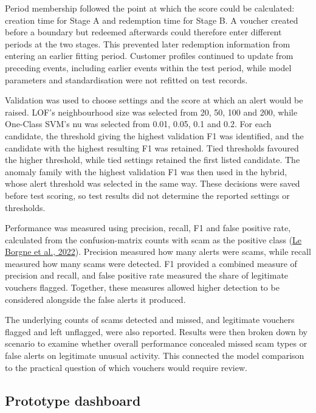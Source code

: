 \documentclass[11pt,a4paper]{article}
\begin{document}
Period membership followed the point at which the score could be calculated: creation time for Stage A and redemption time for Stage B. A voucher created before a boundary but redeemed afterwards could therefore enter different periods at the two stages. This prevented later redemption information from entering an earlier fitting period. Customer profiles continued to update from preceding events, including earlier events within the test period, while model parameters and standardisation were not refitted on test records.

Validation was used to choose settings and the score at which an alert would be raised. LOF's neighbourhood size was selected from 20, 50, 100 and 200, while One-Class SVM's nu was selected from 0.01, 0.05, 0.1 and 0.2. For each candidate, the threshold giving the highest validation F1 was identified, and the candidate with the highest resulting F1 was retained. Tied thresholds favoured the higher threshold, while tied settings retained the first listed candidate. The anomaly family with the highest validation F1 was then used in the hybrid, whose alert threshold was selected in the same way. These decisions were saved before test scoring, so test results did not determine the reported settings or thresholds.

Performance was measured using precision, recall, F1 and false positive rate, calculated from the confusion-matrix counts with scam as the positive class (\href{https://fraud-detection-handbook.github.io/fraud-detection-handbook/Chapter_4_PerformanceMetrics/ThresholdBased.html}{Le Borgne et al., 2022}). Precision measured how many alerts were scams, while recall measured how many scams were detected. F1 provided a combined measure of precision and recall, and false positive rate measured the share of legitimate vouchers flagged. Together, these measures allowed higher detection to be considered alongside the false alerts it produced.

The underlying counts of scams detected and missed, and legitimate vouchers flagged and left unflagged, were also reported. Results were then broken down by scenario to examine whether overall performance concealed missed scam types or false alerts on legitimate unusual activity. This connected the model comparison to the practical question of which vouchers would require review.

\subsection{Prototype dashboard}
\end{document}
